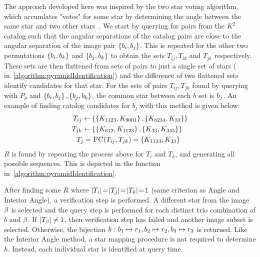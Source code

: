\documentclass[conference]{IEEEtran}
\begin{document}
    The approach developed here was inspired by the two star voting algorithm, which accumlates "votes" for some star by
    determining the angle between the same star and two other stars~\cite{tichy:preliminaryTestsCommericalImagers}.
    We start by querying for pairs from the $K^2$ catalog such that the angular separations of the catalog pairs are
    close to the angular separation of the image pair $\left\{ b_i, b_j \right\}$.
    This is repeated for the other two permutations $\left\{ b_i, b_k \right\}$ and $\left\{  b_j, b_k  \right\}$ to obtain
    the sets $T_{ij}, T_{ik}$ and $T_{jk}$ respectively.
    These sets are then flattened from sets of pairs to just a single set of stars (
    in~\autoref{algorithm:pyramidIdentification}) and the difference of two flattened sets identify candidates for that
    star.
    For the sets of pairs $T_{ij}, T_{jk}$ found by querying with $P_\theta$ and $\left\{ b_i, b_j \right\},
    \left\{ b_j, b_k \right\}$, the common star between each $b$ set is $b_j$.
    An example of finding catalog candidates for $b_j$ with this method is given below:
    \begin{equation}
        \begin{aligned}
            T_{ij} \gets& \set{ \set{\vv{K_{1123}}, \vv{K_{9001}}}, \set{\vv{K_{8234}}, \vv{K_{33}}} } \\
            T_{jk} \gets& \set{ \set{\vv{K_{612}}, \vv{K_{1123}}}, \set{\vv{K_{33}}, \vv{K_{345}}} } \\
            T_j =& \  \Call{FC}{T_{ij}, T_{jk}} = \set{\vv{K_{1123}}, \vv{K_{33}}}
        \end{aligned}
    \end{equation}
    $R$ is found by repeating the process above for $T_i$ and $T_k$, and generating all possible sequences.
    This is depicted in the  function in~\autoref{algorithm:pyramidIdentification}.

    After finding some $R$ where $\left| T_i \right| \!=\! \left| T_j \right| \!=\! \left| T_k \right| \!=\! 1$ (same criterion as Angle and
    Interior Angle), a verification step is performed.
    A different star from the image $\beta$ is selected and the query step is performed for each distinct trio
    combination of $b$ and $\beta$.
    If $\left| T_\beta \right| \neq 1$, then verification step has failed and another image subset is selected.
    Otherwise, the bijection $h : b_1 \mapsto r_1, b_2 \mapsto r_2, b_3 \mapsto r_3$ is
    returned.
    Like the Interior Angle method, a star mapping procedure is not required to determine $h$.
    Instead, each individual star is identified at query time.
\end{document}
